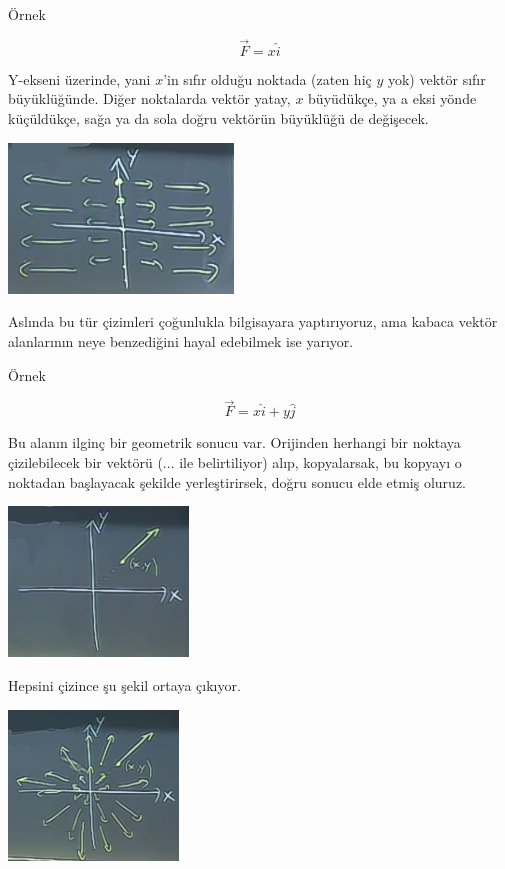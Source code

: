 \documentclass[12pt,fleqn]{article}\usepackage{../../common}
\begin{document}
Örnek

$$ \vec{F} = x\hat{i} $$

Y-ekseni üzerinde, yani $x$'in sıfır olduğu noktada (zaten hiç $y$ yok)
vektör sıfır büyüklüğünde. Diğer noktalarda vektör yatay, $x$ büyüdükçe, ya
a eksi yönde küçüldükçe, sağa ya da sola doğru vektörün büyüklüğü de
değişecek.

\begin{center}
\includegraphics[height=4cm]{19_2.png}
\end{center}

Aslında bu tür çizimleri çoğunlukla bilgisayara yaptırıyoruz, ama kabaca
vektör alanlarının neye benzediğini hayal edebilmek ise yarıyor. 

Örnek

$$ \vec{F} = x\hat{i} + y\hat{j} $$

Bu alanın ilginç bir geometrik sonucu var.  Orijinden herhangi bir noktaya
çizilebilecek bir vektörü (... ile belirtiliyor) alıp, kopyalarsak, bu
kopyayı o noktadan başlayacak şekilde yerleştirirsek, doğru sonucu elde
etmiş oluruz.

\begin{center}
\includegraphics[height=4cm]{19_3.png}
\end{center}

Hepsini çizince şu şekil ortaya çıkıyor. 

\begin{center}
\includegraphics[height=4cm]{19_4.png}
\end{center}
\end{document}
